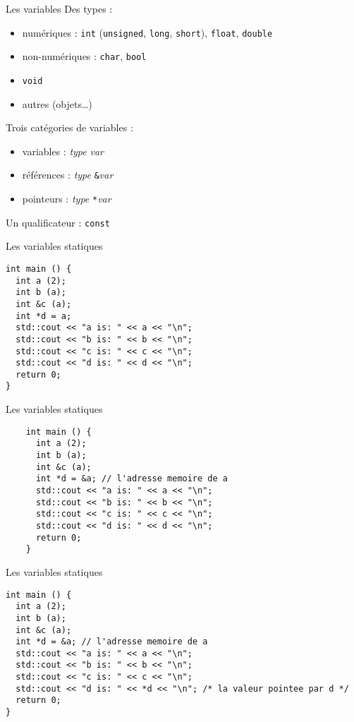 \begin{frame}{Les variables}
  Des types :
  \begin{itemize}
  \item numériques : \texttt{int} (\texttt{unsigned}, \texttt{long}, \texttt{short}), \texttt{float}, \texttt{double}
  \item non-numériques : \texttt{char}, \texttt{bool}
  \item \texttt{void}
  \item autres (objets\dots{})
  \end{itemize}

  Trois catégories de variables :
  \begin{itemize}
  \item variables : \textit{type} \textit{var}
  \item références : \textit{type} \texttt{\&}\textit{var}
  \item pointeurs : \textit{type} \texttt{*}\textit{var}
  \end{itemize}

  Un qualificateur : \texttt{const}
\end{frame}

\begin{frame}[fragile]{Les variables statiques}
  \begin{lstlisting}
int main () {
  int a (2);
  int b (a);
  int &c (a);
  int *d = a;
  std::cout << "a is: " << a << "\n";
  std::cout << "b is: " << b << "\n";
  std::cout << "c is: " << c << "\n";
  std::cout << "d is: " << d << "\n";
  return 0;
}
  \end{lstlisting}
\end{frame}

\begin{frame}[fragile]{Les variables statiques}
  \begin{lstlisting}
    int main () {
      int a (2);
      int b (a);
      int &c (a);
      int *d = &a; // l'adresse memoire de a
      std::cout << "a is: " << a << "\n";
      std::cout << "b is: " << b << "\n";
      std::cout << "c is: " << c << "\n";
      std::cout << "d is: " << d << "\n";
      return 0;
    }
  \end{lstlisting}
\end{frame}

\begin{frame}[fragile]{Les variables statiques}
  \begin{lstlisting}
int main () {
  int a (2);
  int b (a);
  int &c (a);
  int *d = &a; // l'adresse memoire de a
  std::cout << "a is: " << a << "\n";
  std::cout << "b is: " << b << "\n";
  std::cout << "c is: " << c << "\n";
  std::cout << "d is: " << *d << "\n"; /* la valeur pointee par d */
  return 0;
}
  \end{lstlisting}
\end{frame}

